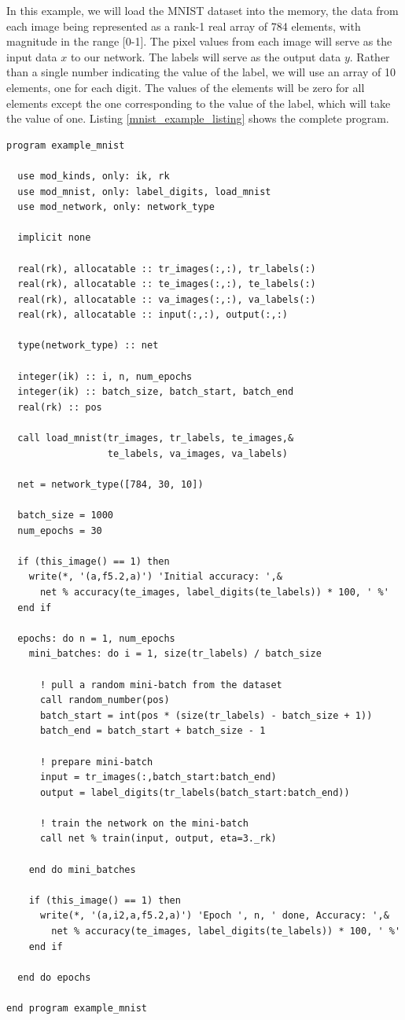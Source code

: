 \documentclass[sigplan, review=false, screen=true, balance=true]{acmart}
\begin{document}
In this example, we will load the MNIST dataset into the memory, the data from
each image being represented as a rank-1 real array of 784 elements, with
magnitude in the range [0-1]. The pixel values from each image will serve as the
input data $x$ to our network. The labels will serve as the output data $y$.
Rather than a single number indicating the value of the label, we will use
an array of 10 elements, one for each digit. The values of the elements will
be zero for all elements except the one corresponding to the value of the label,
which will take the value of one.
Listing \ref{mnist_example_listing} shows the complete program.

\begin{lstlisting}[caption={The complete program to train and evaluate a neural network using the MNIST dataset of handwritten digits.}, captionpos=b, float=*, label={mnist_example_listing}]
program example_mnist

  use mod_kinds, only: ik, rk
  use mod_mnist, only: label_digits, load_mnist
  use mod_network, only: network_type

  implicit none

  real(rk), allocatable :: tr_images(:,:), tr_labels(:)
  real(rk), allocatable :: te_images(:,:), te_labels(:)
  real(rk), allocatable :: va_images(:,:), va_labels(:)
  real(rk), allocatable :: input(:,:), output(:,:)

  type(network_type) :: net

  integer(ik) :: i, n, num_epochs
  integer(ik) :: batch_size, batch_start, batch_end
  real(rk) :: pos

  call load_mnist(tr_images, tr_labels, te_images,&
                  te_labels, va_images, va_labels)

  net = network_type([784, 30, 10])

  batch_size = 1000
  num_epochs = 30

  if (this_image() == 1) then
    write(*, '(a,f5.2,a)') 'Initial accuracy: ',&
      net % accuracy(te_images, label_digits(te_labels)) * 100, ' %'
  end if

  epochs: do n = 1, num_epochs
    mini_batches: do i = 1, size(tr_labels) / batch_size

      ! pull a random mini-batch from the dataset
      call random_number(pos)
      batch_start = int(pos * (size(tr_labels) - batch_size + 1))
      batch_end = batch_start + batch_size - 1

      ! prepare mini-batch
      input = tr_images(:,batch_start:batch_end)
      output = label_digits(tr_labels(batch_start:batch_end))

      ! train the network on the mini-batch
      call net % train(input, output, eta=3._rk)

    end do mini_batches

    if (this_image() == 1) then
      write(*, '(a,i2,a,f5.2,a)') 'Epoch ', n, ' done, Accuracy: ',&
        net % accuracy(te_images, label_digits(te_labels)) * 100, ' %'
    end if

  end do epochs

end program example_mnist
\end{lstlisting}
\end{document}
